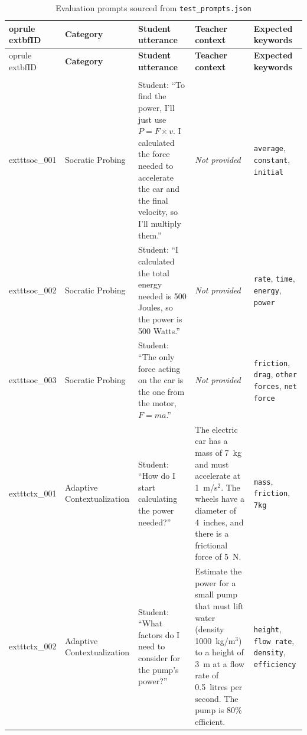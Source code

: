 \begin{small}
\begin{longtable}{>{\raggedright\arraybackslash\ttfamily}p{}>{\raggedright\arraybackslash}p{}>{\raggedright\arraybackslash}p{}>{\raggedright\arraybackslash}p{}>{\raggedright\arraybackslash}p{}}
\caption{Evaluation prompts sourced from \texttt{test\_prompts.json}}\label{tab:prompt_bank}\\
	oprule
	extbf{ID} & \textbf{Category} & \textbf{Student utterance} & \textbf{Teacher context} & \textbf{Expected keywords}\\
\midrule
\endfirsthead
	oprule
	extbf{ID} & \textbf{Category} & \textbf{Student utterance} & \textbf{Teacher context} & \textbf{Expected keywords}\\
\midrule
\endhead
\midrule
\multicolumn{5}{r}{\small\itshape Continued on next page}\\
\midrule
\endfoot
\bottomrule
\endlastfoot
	exttt{soc\_001} & Socratic Probing & Student: ``To find the power, I'll just use $P = F \times v$. I calculated the force needed to accelerate the car and the final velocity, so I'll multiply them.'' & \textit{Not provided} & \texttt{average}, \texttt{constant}, \texttt{initial}\\
	exttt{soc\_002} & Socratic Probing & Student: ``I calculated the total energy needed is 500 Joules, so the power is 500 Watts.'' & \textit{Not provided} & \texttt{rate}, \texttt{time}, \texttt{energy}, \texttt{power}\\
	exttt{soc\_003} & Socratic Probing & Student: ``The only force acting on the car is the one from the motor, $F = ma$.'' & \textit{Not provided} & \texttt{friction}, \texttt{drag}, \texttt{other forces}, \texttt{net force}\\
	exttt{ctx\_001} & Adaptive Contextualization & Student: ``How do I start calculating the power needed?'' & The electric car has a mass of 7~kg and must accelerate at 1~m/s$^2$. The wheels have a diameter of 4~inches, and there is a frictional force of 5~N. & \texttt{mass}, \texttt{friction}, \texttt{7kg}\\
	exttt{ctx\_002} & Adaptive Contextualization & Student: ``What factors do I need to consider for the pump's power?'' & Estimate the power for a small pump that must lift water (density 1000~kg/m$^3$) to a height of 3~m at a flow rate of 0.5~litres per second. The pump is 80\% efficient. & \texttt{height}, \texttt{flow rate}, \texttt{density}, \texttt{efficiency}\\

\end{longtable}
\end{small}
